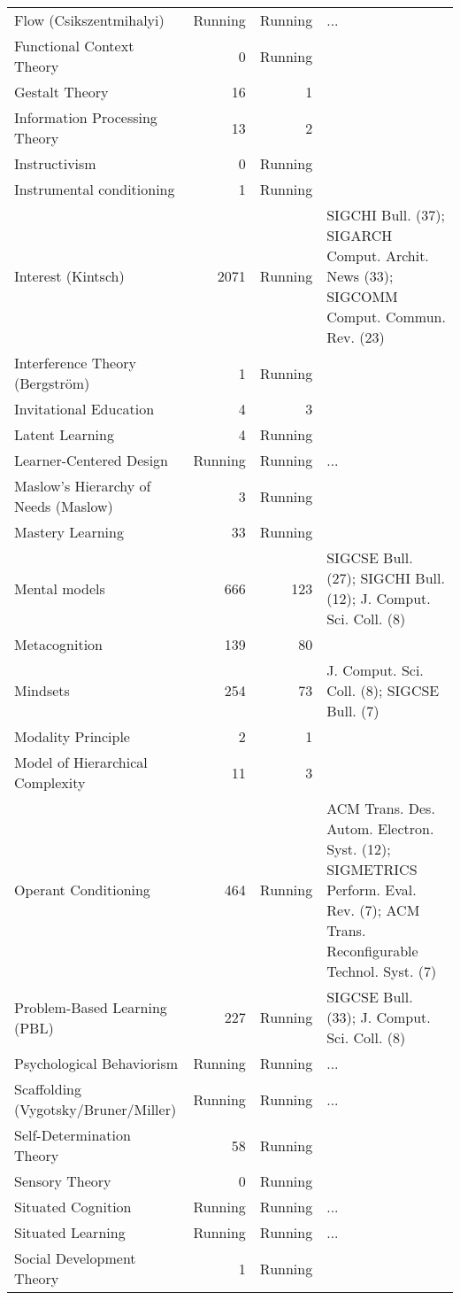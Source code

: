 \begin{table*}[t]
\begin{tabular}{lrrp{6cm}}
Flow (Csikszentmihalyi) & Running & Running & ... \\
Functional Context Theory & 0 & Running &  \\
Gestalt Theory & 16 & 1 &  \\
Information Processing Theory & 13 & 2 &  \\
Instructivism & 0 & Running &  \\
Instrumental conditioning & 1 & Running &  \\
Interest (Kintsch) & 2071 & Running & SIGCHI Bull. (37); SIGARCH Comput. Archit. News (33); SIGCOMM Comput. Commun. Rev. (23) \\
Interference Theory (Bergström) & 1 & Running &  \\
Invitational Education & 4 & 3 &  \\
Latent Learning & 4 & Running &  \\
Learner-Centered Design & Running & Running & ... \\
Maslow's Hierarchy of Needs (Maslow) & 3 & Running &  \\
Mastery Learning & 33 & Running &  \\
Mental models & 666 & 123 & SIGCSE Bull. (27); SIGCHI Bull. (12); J. Comput. Sci. Coll. (8) \\
Metacognition & 139 & 80 &  \\
Mindsets & 254 & 73 & J. Comput. Sci. Coll. (8); SIGCSE Bull. (7) \\
Modality Principle & 2 & 1 &  \\
Model of Hierarchical Complexity & 11 & 3 &  \\
Operant Conditioning & 464 & Running & ACM Trans. Des. Autom. Electron. Syst. (12); SIGMETRICS Perform. Eval. Rev. (7); ACM Trans. Reconfigurable Technol. Syst. (7) \\
Problem-Based Learning (PBL) & 227 & Running & SIGCSE Bull. (33); J. Comput. Sci. Coll. (8) \\
Psychological Behaviorism & Running & Running & ... \\
Scaffolding (Vygotsky/Bruner/Miller) & Running & Running & ... \\
Self-Determination Theory & 58 & Running &  \\
Sensory Theory & 0 & Running &  \\
Situated Cognition & Running & Running & ... \\
Situated Learning & Running & Running & ... \\
Social Development Theory & 1 & Running &  \\

\end{tabular}
\end{table*}
